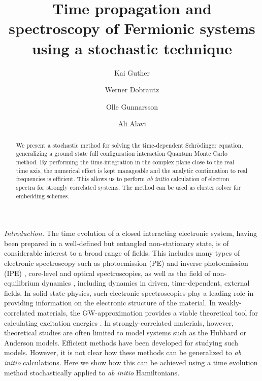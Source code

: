 \documentclass[aps,prl,twocolumn,showpacs,superscriptaddress,floatfix]{revtex4-1}
\begin{document}
\title{Time propagation and spectroscopy of Fermionic systems using a stochastic technique} 
\author{Kai Guther}
\author{Werner Dobrautz}
\author{Olle Gunnarsson}
\author{Ali Alavi}


\begin{abstract}
We present a stochastic method for solving the time-dependent Schr\"odinger equation,
generalizing a ground state full configuration interaction Quantum Monte Carlo method. 
By performing the time-integration in the complex plane close to the real time axis, the numerical
effort is kept manageable and the analytic continuation to real frequencies is efficient.
This allows us to perform {\it ab initio} calculation of electron spectra for
strongly correlated systems. The method can be used as cluster solver for embedding schemes.
\end{abstract}
\maketitle
{\it Introduction.}
The time evolution of a closed interacting electronic system, having been prepared in a well-defined but entangled non-stationary 
state, is of considerable interest to a broad range of fields. This includes many types of electronic 
spectroscopy such as photoemission (PE) and inverse photoemission (IPE) \cite{HL1969,T1970,
  HF1984} , core-level \cite{PSBM1976, MS1983} and optical spectroscopies, as well as the field of 
non-equilibrium dynamics \cite{PSAM2011}, including dynamics in driven, time-dependent, external fields.
In solid-state physics, such electronic spectroscopies play a leading role in providing information on the 
electronic structure of the material. In weakly-correlated materials, the
GW-approximation provides a viable theoretical tool for calculating excitation
energies \cite{HL1969, ORR2002}. In strongly-correlated materials, however,  
theoretical studies are often limited to model systems such as the Hubbard \cite{Hubbard} or 
Anderson \cite{Anderson} models. 
Efficient methods have been developed for studying such models.\cite{dca,continuoustime}
However, it is not clear how these methods can be generalized to {\it ab
  initio} calculations. Here we show how this can be achieved using a time evolution method stochastically applied to {\em ab initio} Hamiltonians.  
\end{document}
